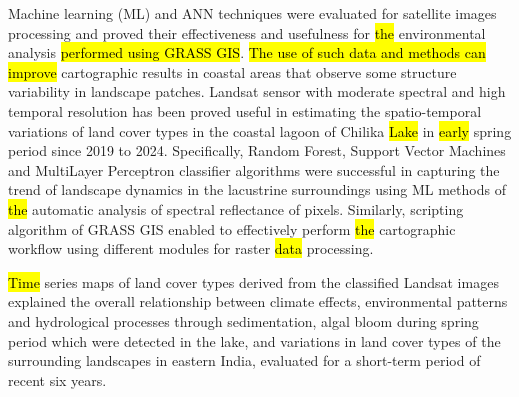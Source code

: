 \documentclass[jmse,article,submit,pdftex,moreauthors]{Definitions/mdpi}
\begin{document}
Machine learning (ML) and ANN techniques were evaluated for satellite images processing and proved their effectiveness and usefulness for \hl{the }environmental analysis \hl{performed using GRASS GIS}. \hl{The use of such data and methods can improve }cartographic results in coastal areas that observe some structure variability in landscape patches. Landsat sensor with moderate spectral and high temporal resolution has been proved useful in estimating the spatio-temporal variations of land cover types in the coastal lagoon of Chilika \hl{Lake }in \hl{early }spring period since 2019 to 2024. Specifically, Random Forest, Support Vector Machines and MultiLayer Perceptron classifier algorithms were successful in capturing the trend of landscape dynamics in the lacustrine surroundings using ML methods of \hl{the }automatic analysis of spectral reflectance of pixels. Similarly,\hl{ }scripting algorithm of GRASS GIS enabled to effectively perform \hl{the }cartographic workflow using different modules for raster \hl{data} processing. 

\hl{Time} series maps of land cover types derived from the classified Landsat images explained the overall relationship between climate effects, environmental patterns and hydrological processes through sedimentation, algal bloom during spring period which were detected in the lake, and  variations in land cover types of the surrounding landscapes in eastern India, evaluated for a short-term period of recent six years.





\end{document}
